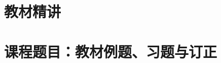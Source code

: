 \documentclass[11pt,a4paper,fontset=fandol]{ctexart}
\begin{document}
\maketitle
\begingroup
\setlength{\parskip}{0pt}
\tableofcontents
\endgroup
\clearpage



\clearpage
\part{教材精讲}
















\part{课程题目：教材例题、习题与订正}














\end{document}
